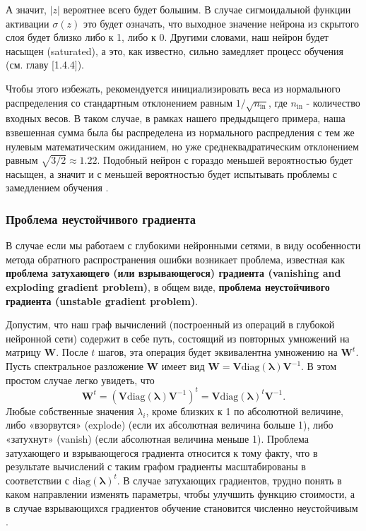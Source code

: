 А значит, $|z|$ вероятнее всего будет большим. В случае сигмоидальной функции активации 
$\sigma(z)$ это будет означать, что выходное значение нейрона из скрытого слоя будет 
близко либо к 1, либо к 0. Другими словами, наш нейрон будет насыщен (saturated), а это, 
как известно, сильно замедляет процесс обучения (см. главу [1.4.4]). 

Чтобы этого избежать, рекомендуется инициализировать веса из нормального распределения со 
стандартным отклонением равным $1/\sqrt{n_\text{in}}$, где $n_\text{in}$ - количество входных 
весов. В таком случае, в рамках нашего предыдыщего примера, наша взвешенная сумма была бы 
распределена из нормального распредления с тем же нулевым математическим ожиданием, но 
уже среднеквадратическим отклонением равным $\sqrt{3/2} \approx 1.22$. Подобный нейрон с 
гораздо меньшей вероятностью будет насыщен, а значит и с меньшей вероятностью будет 
испытывать проблемы с замедлением обучения \cite{NN_Nielsen}.

\subsubsection{Проблема неустойчивого градиента}



В случае если мы работаем с глубокими нейронными сетями, в виду особенности метода обратного 
распространения ошибки возникает проблема, известная как \textbf{проблема затухающего (или взрывающегося) 
градиента (vanishing and exploding gradient problem)}, в общем виде, \textbf{проблема неустойчивого 
градиента (unstable gradient problem)}. 

Допустим, что наш граф вычислений (построенный из операций в глубокой нейронной сети) содержит в себе 
путь, состоящий из повторных умножений на матрицу $\bm{W}$. После $t$ шагов, эта операция будет эквивалентна 
умножению на $\bm{W}^t$. Пусть спектральное разложение $\bm{W}$ имеет вид 
$\bm{W} = \bm{V} \text{diag}(\bm{\lambda}) \bm{V}^{-1}$. В этом простом случае легко увидеть, что
\begin{equation*}
    \bm{W}^t = (\bm{V}\text{diag}(\bm{\lambda})\bm{V}^{-1})^t = \bm{V}\text{diag}(\bm{\lambda})^t \bm{V}^{-1}.
\end{equation*}
Любые собственные значения $\lambda_i$, кроме близких к 1 по абсолютной величине, либо «взорвутся» (explode) 
(если их абсолютная величина больше 1), либо «затухнут» (vanish) (если абсолютная величина меньше 1). 
Проблема затухающего и взрывающегося градиента относится к тому факту, что в результате вычислений с таким графом 
градиенты масштабированы в соответствии с $\text{diag}(\bm{\lambda})^t$. В случае затухающих градиентов, трудно 
понять в каком направлении изменять параметры, чтобы улучшить функцию стоимости, а в случае взрывающихся градиентов 
обучение становится численно неустойчивым \cite{Goodfellow-et-al-2016}. 

